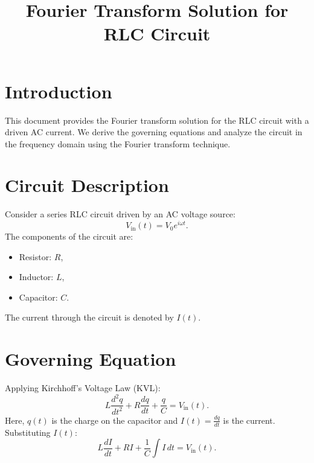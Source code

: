 \documentclass[a4paper,11pt]{article}
\begin{document}
\title{Fourier Transform Solution for RLC Circuit}
\author{}
\date{}
\maketitle

\section*{Introduction}
This document provides the Fourier transform solution for the RLC circuit with a driven AC current. We derive the governing equations and analyze the circuit in the frequency domain using the Fourier transform technique.

\section*{Circuit Description}
Consider a series RLC circuit driven by an AC voltage source:
\[
V_{\text{in}}(t) = V_0 e^{i\omega t}.
\]
The components of the circuit are:
\begin{itemize}
    \item Resistor: \(R\),
    \item Inductor: \(L\),
    \item Capacitor: \(C\).
\end{itemize}

The current through the circuit is denoted by \(I(t)\).

\section*{Governing Equation}
Applying Kirchhoff's Voltage Law (KVL):
\[
L \frac{d^2q}{dt^2} + R \frac{dq}{dt} + \frac{q}{C} = V_{\text{in}}(t).
\]
Here, \(q(t)\) is the charge on the capacitor and \(I(t) = \frac{dq}{dt}\) is the current. Substituting \(I(t)\):
\[
L \frac{dI}{dt} + R I + \frac{1}{C} \int I \, dt = V_{\text{in}}(t).
\]
\end{document}
